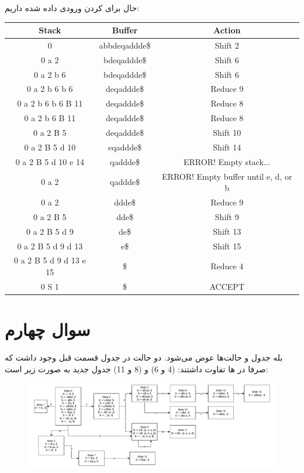 \documentclass[]{article}
\begin{document}
حال برای
کردن ورودی داده شده داریم:
\begin{latin}
    \centering
    \begin{tabular}{c|c|c}
        \textbf{Stack} & \textbf{Buffer} & \textbf{Action}\\
        \hline
        0 & abbdeqaddde\$ & Shift 2\\
        0 a 2 & bdeqaddde\$ & Shift 6\\
        0 a 2 b 6 & bdeqaddde\$ & Shift 6\\
        0 a 2 b 6 b 6 & deqaddde\$ & Reduce 9\\
        0 a 2 b 6 b 6 B 11 & deqaddde\$ & Reduce 8\\
        0 a 2 b 6 B 11 & deqaddde\$ & Reduce 8 \\
        0 a 2 B 5 & deqaddde\$ & Shift 10 \\
        0 a 2 B 5 d 10 & eqaddde\$ & Shift 14 \\
        0 a 2 B 5 d 10 e 14 & qaddde\$ & ERROR! Empty stack... \\
        0 a 2 & qaddde\$ & ERROR! Empty buffer until e, d, or b \\
        0 a 2 & ddde\$ & Reduce 9 \\
        0 a 2 B 5 & dde\$ & Shift 9 \\
        0 a 2 B 5 d 9 & de\$ & Shift 13 \\
        0 a 2 B 5 d 9 d 13 & e\$ & Shift 15 \\
        0 a 2 B 5 d 9 d 13 e 15 & \$ & Reduce 4 \\
        0 S 1 & \$ & ACCEPT \\
    \end{tabular}
\end{latin}
\section*{سوال چهارم}
بله جدول و حالت‌ها عوض می‌شود. دو حالت در جدول قسمت قبل وجود داشت که صرفا در
ها
تفاوت داشتند:
(4 و 6) و (8 و 11)
جدول جدید به صورت زیر است:
\begin{figure}[H]
    \centering
    \includegraphics[width=1\textwidth]{figure/Q4.pdf}
\end{figure}
\end{document}
